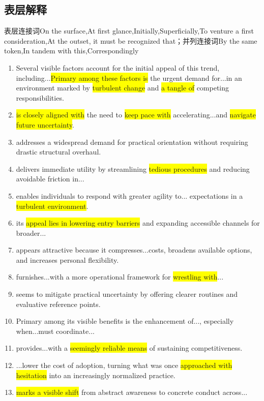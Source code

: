 ﻿\documentclass[lang=cn,11pt]{elegantbook}
\begin{document}
\subsection{表层解释}
表层连接词On the surface,At first glance,Initially,Superficially,To venture a first consideration,At the outset, it must be recognized that；并列连接词By the same token,In tandem with this,Correspondingly
\begin{enumerate}
    \item Several visible factors account for the initial appeal of this trend, including...\colorbox{yellow}{Primary among these factors is} the urgent demand for...in an environment marked by \colorbox{yellow}{turbulent change} and \colorbox{yellow}{a tangle of} competing responsibilities.
    \item \colorbox{yellow}{is closely aligned with} the need to \colorbox{yellow}{keep pace with} accelerating...and \colorbox{yellow}{navigate future uncertainty}.
    \item addresses a widespread demand for practical orientation without requiring drastic structural overhaul.
    \item delivers immediate utility by streamlining \colorbox{yellow}{tedious procedures} and reducing avoidable friction in...
    \item enables individuals to respond with greater agility to... expectations in a \colorbox{yellow}{turbulent environment}.
    \item its \colorbox{yellow}{appeal lies in lowering entry barriers} and expanding accessible channels for broader...
    \item appears attractive because it compresses...costs, broadens available options, and increases personal flexibility.
    \item furnishes...with a more operational framework for \colorbox{yellow}{wrestling with}...
    \item seems to mitigate practical uncertainty by offering clearer routines and evaluative reference points.
    \item Primary among its visible benefits is the enhancement of..., especially when...must coordinate...
    \item provides...with a \colorbox{yellow}{seemingly reliable means} of sustaining competitiveness.
    \item ...lower the cost of adoption, turning what was once \colorbox{yellow}{approached with hesitation} into an increasingly normalized practice.
    \item \colorbox{yellow}{marks a visible shift} from abstract awareness to concrete conduct across...

\end{enumerate}
\end{document}
